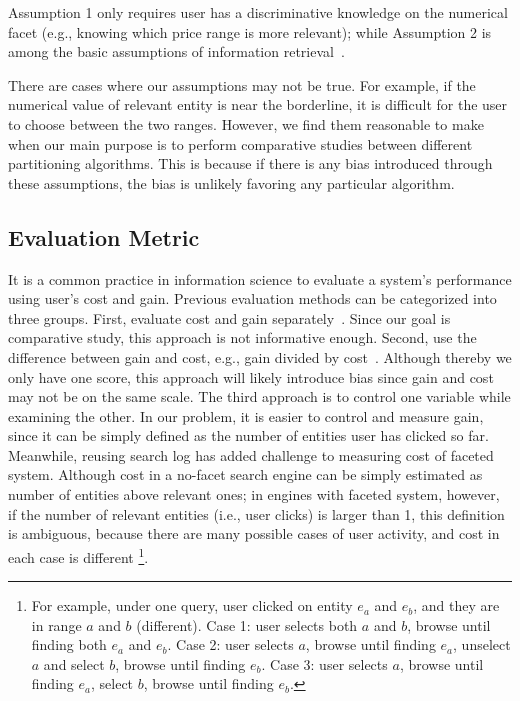 Assumption 1 only requires user has a discriminative knowledge on the numerical facet (e.g., knowing which price range is more relevant); while Assumption 2 is among the basic assumptions of information retrieval~\cite{Craswell:2008:ECC:1341531.1341545,robertson-the-1997}. 

There are cases where our assumptions may not be true. For example, if the numerical value of relevant entity is near the borderline, it is difficult for the user to choose between the two ranges. However, we find them reasonable to make when our main purpose is to perform comparative studies between different partitioning algorithms. This is because if there is any bias introduced through these assumptions, the bias is unlikely favoring any particular algorithm. 


\subsection{Evaluation Metric}
\label{sec:metric}

\newcommand\rrank{\mathop{\mbox{$Refined$-$Rank$}}}
It is a common practice in information science to evaluate a system's performance using user's cost and gain. Previous evaluation methods can be categorized into three groups. First, evaluate cost and gain separately~\cite{conf/cikm/YilmazVCRB14}. Since our goal is comparative study, this approach is not informative enough. Second, use the difference between gain and cost, e.g., gain divided by cost~\cite{card:1999}. Although thereby we only have one score, this approach will likely introduce bias since gain and cost may not be on the same scale. The third approach is to control one variable while examining the other. In our problem, it is easier to control and measure gain, since it can be simply defined as the number of entities user has clicked so far. Meanwhile, reusing search log has added challenge to measuring cost of faceted system. Although cost in a no-facet search engine can be simply estimated as number of entities above relevant ones; in engines with faceted system, however, if the number of relevant entities (i.e., user clicks) is larger than 1, this definition is ambiguous, because there are many possible cases of user activity, and cost in each case is different \footnote{For example, under one query, user clicked on entity $e_a$ and $e_b$, and they are in range $a$ and $b$ (different). Case 1: user selects both $a$ and $b$,  browse until finding both $e_a$ and $e_b$. Case 2: user selects $a$, browse until finding $e_a$, unselect $a$ and select $b$, browse until finding $e_b$. Case 3: user selects $a$, browse until finding $e_a$, select $b$, browse until finding $e_b$. }.

